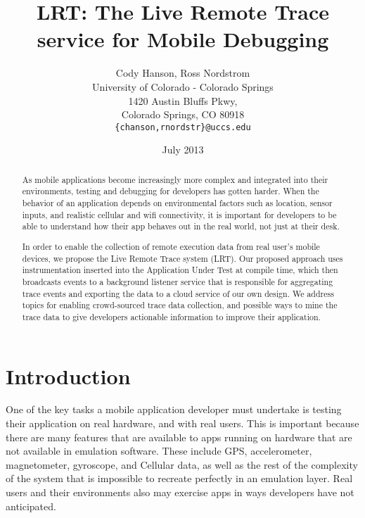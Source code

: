 \documentclass{acm_proc_article-sp}
\begin{document}
\title{LRT: The Live Remote Trace service for Mobile Debugging}
\author{Cody Hanson, Ross Nordstrom\\
        University of Colorado - Colorado Springs\\
        1420 Austin Bluffs Pkwy,\\
        Colorado Springs, CO 80918\\
        \texttt{\{chanson,rnordstr\}@uccs.edu}
       }
\date{July 2013}

\maketitle

\begin{abstract}
    As mobile applications become increasingly  more complex and integrated into their
    environments, testing and debugging for developers has gotten harder.
    When the behavior of an application depends on environmental factors 
    such as location, sensor inputs, and realistic cellular and wifi connectivity,
    it is important for developers to be able to understand how their app
    behaves out in the real world, not just at their desk.

    In order to enable the collection of remote execution data from real user's
    mobile devices, we propose the Live Remote Trace system (LRT). Our proposed
    approach uses instrumentation inserted into the Application Under Test at compile time,
    which then broadcasts events to a background listener service that is responsible for
    aggregating trace events and exporting the data to a cloud service of our
    own design. We address topics for enabling crowd-sourced trace data collection,
    and possible ways to mine the trace data to give developers actionable 
    information to improve their application.
\end{abstract}


\section{Introduction}
One of the key tasks a mobile application developer must undertake is testing 
their application on real hardware, and with real users. This is important 
because there are many features that are available to apps running on hardware 
that are not available in emulation software. These include GPS, accelerometer, 
magnetometer, gyroscope, and Cellular data, as well as the rest of the 
complexity of the system that is impossible to recreate perfectly in an 
emulation layer. Real users and their environments also may exercise apps in
ways developers have not anticipated. 
\end{document}
